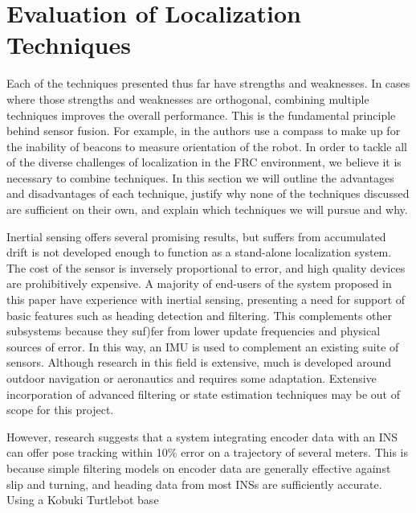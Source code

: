 \documentclass{article}
\begin{document}
\section{Evaluation of Localization Techniques} \label{methods}

  Each of the techniques presented thus far have strengths and weaknesses. In cases where those strengths and weaknesses are orthogonal, combining multiple techniques improves the overall performance. This is the fundamental principle behind sensor fusion. For example, in \cite{kim_advanced_2008} the authors use a compass to make up for the inability of beacons to measure orientation of the robot. In order to tackle all of the diverse challenges of localization in the FRC environment, we believe it is necessary to combine techniques. In this section we will outline the advantages and disadvantages of each technique, justify why none of the techniques discussed are sufficient on their own, and explain which techniques we will pursue and why.

  Inertial sensing offers several promising results, but suffers from accumulated drift is not developed enough to function as a stand-alone localization system. The cost of the sensor is inversely proportional to error, and high quality devices are prohibitively expensive. A majority of end-users of the system proposed in this paper have experience with inertial sensing, presenting a need for support of basic features such as heading detection and filtering. This complements other subsystems because they suf)fer from lower update frequencies and physical sources of error. In this way, an IMU is used to complement an existing suite of sensors. Although research in this field is extensive, much is developed around outdoor navigation or aeronautics and requires some adaptation. Extensive incorporation of advanced filtering or state estimation techniques may be out of scope for this project.
  
  However, research suggests that a system integrating encoder data with an INS can offer pose tracking within 10\% error on a trajectory of several meters. This is because simple filtering models on encoder data are generally effective against slip and turning, and heading data from most INSs are sufficiently accurate. Using a Kobuki Turtlebot base 
\end{document}
